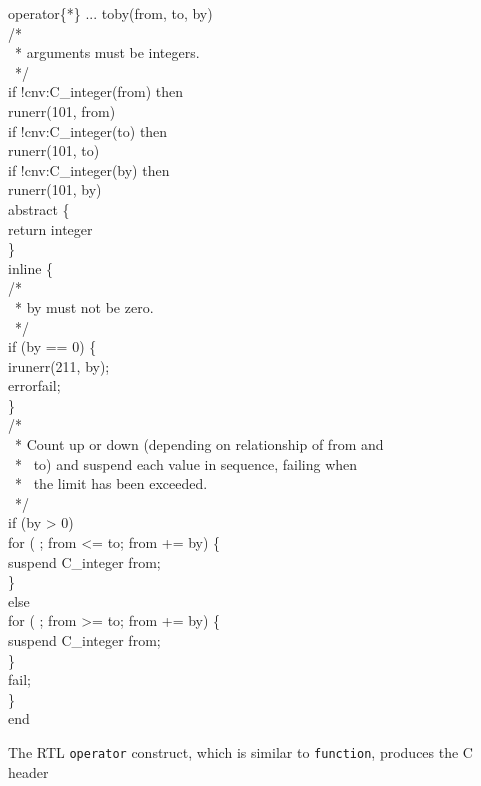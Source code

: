 \begin{iconcode}
operator\{*\} ... toby(from, to, by)\\
\>/*\\
\>\ * arguments must be integers.\\
\>\ */\\
\>if !cnv:C\_integer(from) then\\
\>\>runerr(101, from)\\
\>if !cnv:C\_integer(to) then\\
\>\>runerr(101, to)\\
\>if !cnv:C\_integer(by) then\\
\>\>runerr(101, by)\\
\>abstract \{\\
\>\>return integer\\
\>\>\}\\
\>inline \{\\
\>\>/*\\
\>\>\ * by must not be zero.\\
\>\>\ */\\
\>\>if (by == 0) \{\\
\>\>\>irunerr(211, by);\\
\>\>\>errorfail;\\
\>\>\>\}\\
\>\>/*\\
\>\>\ * Count up or down (depending on relationship of from and\\
\>\>\ * \ to) and suspend each value in sequence, failing when\\
\>\>\ * \ the limit has been exceeded.\\
\>\>\ */\\
\>\>if (by > 0)\\
\>\>\>for ( ; from <= to; from += by) \{\\
\>\>\>\>suspend C\_integer from;\\
\>\>\>\>\}\\
\>\>else\\
\>\>\>for ( ; from >= to; from += by) \{\\
\>\>\>\>suspend C\_integer from;\\
\>\>\>\>\}\\
\>\>fail;\\
\>\>\}\\
end
\end{iconcode}

The RTL \texttt{operator} construct, which is similar to
\texttt{function}, produces the C header

